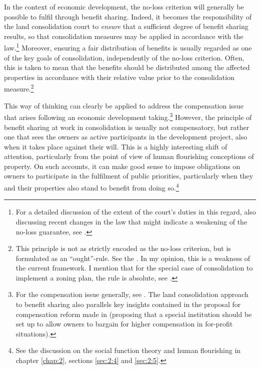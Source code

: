 
In the context of economic development, the no-loss criterion will generally be possible to fulfil  through benefit sharing. Indeed, it becomes the responsibility of the land consolidation court to {\it ensure} that a sufficient degree of benefit sharing results, so that consolidation measures may be applied in accordance with the law.\footnote{For a detailed discussion of the extent of the court's duties in this regard, also discussing recent changes in the law that might indicate a weakening of the no-loss guarantee, see \cite{hauge15}.} Moreover, ensuring a fair distribution of benefits is usually regarded as one of the key goals of consolidation, independently of the no-loss criterion. Often, this is taken to mean that the benefits should be distributed among the affected properties in accordance with their relative value prior to the consolidation measure.\footnote{This principle is not as strictly encoded as the no-loss criterion, but is formulated as an ``ought''-rule. See the \dni\cite[31|41]{lca79}. In my opinion, this is a weakness of the current framework. I mention that for the special case of consolidation to implement a zoning plan, the rule is absolute, see \dni\cite[3 b)]{lca79}.}

This way of thinking can clearly be applied to address the compensation issue that arises following an  economic development taking.\footnote{For the compensation issue generally, see \cite{fennell04,bell07}. The land consolidation approach to benefit sharing also parallels key insights contained in the proposal for compensation reform made in \cite{lehavi07} (proposing that a special institution should be set up to allow owners to bargain for higher compensation in for-profit situations).} However, the principle of benefit sharing at work in consolidation is usually not compensatory, but rather one that sees the owners as active participants in the development project, also when it takes place against their will. This is a highly interesting shift of attention, particularly from the point of view of human flourishing conceptions of property. On such accounts, it can make good sense to impose obligations on owners to participate in the fulfilment of public priorities, particularly when they and their properties also stand to benefit from doing so.\footnote{See the discussion on the social function theory and human flourishing in chapter \ref{chap:2}, sections \ref{sec:2:4} and \ref{sec:2:5}.}

